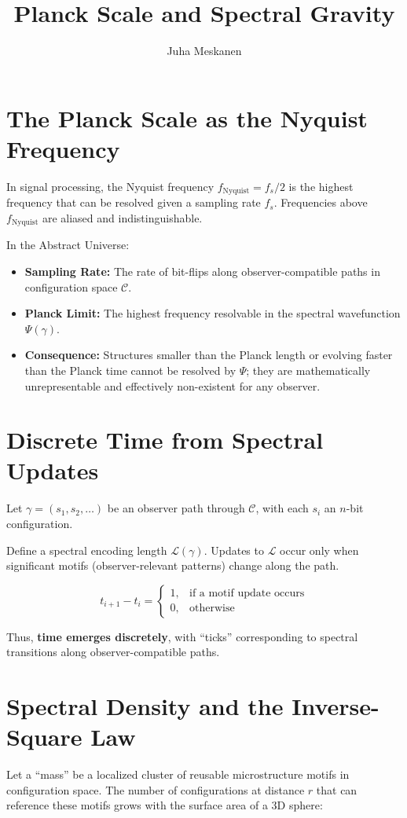 \documentclass[11pt]{article}
\title{Planck Scale and Spectral Gravity}
\author{Juha Meskanen}
\begin{document}
\maketitle


\section{The Planck Scale as the Nyquist Frequency}  
In signal processing, the Nyquist frequency \(f_\mathrm{Nyquist} = f_s/2\) is the highest frequency that can be resolved given a sampling rate \(f_s\). Frequencies above \(f_\mathrm{Nyquist}\) are aliased and indistinguishable.  

In the Abstract Universe:

\begin{itemize}
    \item \textbf{Sampling Rate:} The rate of bit-flips along observer-compatible paths in configuration space \(\mathcal{C}\).  
    \item \textbf{Planck Limit:} The highest frequency resolvable in the spectral wavefunction \(\Psi(\gamma)\).  
    \item \textbf{Consequence:} Structures smaller than the Planck length or evolving faster than the Planck time cannot be resolved by \(\Psi\); they are mathematically unrepresentable and effectively non-existent for any observer.
\end{itemize}

\section{Discrete Time from Spectral Updates}  
Let \(\gamma = (s_1, s_2, \dots)\) be an observer path through \(\mathcal{C}\), with each \(s_i\) an \(n\)-bit configuration.  

Define a spectral encoding length \(\mathcal{L}(\gamma)\). Updates to \(\mathcal{L}\) occur only when significant motifs (observer-relevant patterns) change along the path.  

\[
t_{i+1} - t_i = 
\begin{cases}
1, & \text{if a motif update occurs} \\
0, & \text{otherwise}
\end{cases}
\]

Thus, \textbf{time emerges discretely}, with “ticks” corresponding to spectral transitions along observer-compatible paths.  

\section{Spectral Density and the Inverse-Square Law}  
Let a “mass” be a localized cluster of reusable microstructure motifs in configuration space. The number of configurations at distance \(r\) that can reference these motifs grows with the surface area of a 3D sphere:
\end{document}
